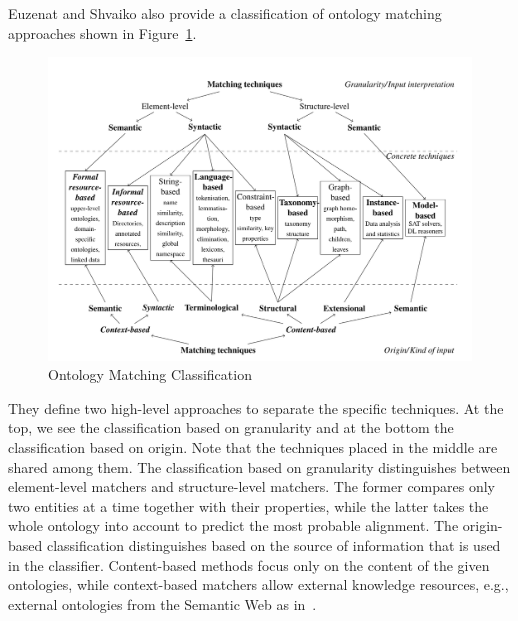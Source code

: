 Euzenat and Shvaiko also provide a classification of ontology matching approaches shown in Figure~\ref{fig:ontology-matching-classification}.
\begin{figure}[!htbp]
    \centering
    \includegraphics[width=13cm]{images/ontology-matching-classification.png}
    \caption[Ontology Matching Classification]{Ontology Matching Classification~\cite{euzenat2007ontology}}
    \label{fig:ontology-matching-classification}
\end{figure}
They define two high-level approaches to separate the specific techniques.
At the top, we see the classification based on granularity and at the bottom the classification based on origin.
Note that the techniques placed in the middle are shared among them.
The classification based on granularity distinguishes between element-level matchers and structure-level matchers.
The former compares only two entities at a time together with their properties, while the latter
takes the whole ontology into account to predict the most probable alignment.
The origin-based classification distinguishes based on the source of information that is used in
the classifier.
Content-based methods focus only on the content of the given ontologies, while context-based matchers allow external
knowledge resources, e.g., external ontologies from the Semantic Web as in~\cite{sabou2008exploring}.

